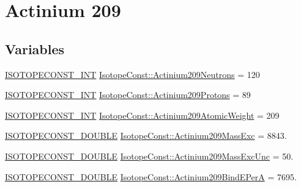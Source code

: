 \hypertarget{group___isotope_const-_actinium-_ac209}{}\section{Actinium 209}
\label{group___isotope_const-_actinium-_ac209}
\subsection*{Variables}
\begin{DoxyCompactItemize}
\item 
\mbox{\hyperlink{group___isotope_const-_macros_ga5f18360b3e99483a35c32d789e62621c}{I\+S\+O\+T\+O\+P\+E\+C\+O\+N\+S\+T\+\_\+\+I\+NT}} \mbox{\hyperlink{group___isotope_const-_actinium-_ac209_gaa674ca398914c47484caeee5ff81a41c}{Isotope\+Const\+::\+Actinium209\+Neutrons}} = 120
\item 
\mbox{\hyperlink{group___isotope_const-_macros_ga5f18360b3e99483a35c32d789e62621c}{I\+S\+O\+T\+O\+P\+E\+C\+O\+N\+S\+T\+\_\+\+I\+NT}} \mbox{\hyperlink{group___isotope_const-_actinium-_ac209_ga658730d0fc7c67960dddf769d1a6eb6e}{Isotope\+Const\+::\+Actinium209\+Protons}} = 89
\item 
\mbox{\hyperlink{group___isotope_const-_macros_ga5f18360b3e99483a35c32d789e62621c}{I\+S\+O\+T\+O\+P\+E\+C\+O\+N\+S\+T\+\_\+\+I\+NT}} \mbox{\hyperlink{group___isotope_const-_actinium-_ac209_ga344bf54eb6c8e582bc6d52e0c2c18f81}{Isotope\+Const\+::\+Actinium209\+Atomic\+Weight}} = 209
\item 
\mbox{\hyperlink{group___isotope_const-_macros_ga8f45a7272ce02c0b4c65c44636ed719a}{I\+S\+O\+T\+O\+P\+E\+C\+O\+N\+S\+T\+\_\+\+D\+O\+U\+B\+LE}} \mbox{\hyperlink{group___isotope_const-_actinium-_ac209_ga9e7c50af5b80062c038f52805f46bdc5}{Isotope\+Const\+::\+Actinium209\+Mass\+Exc}} = 8843.
\item 
\mbox{\hyperlink{group___isotope_const-_macros_ga8f45a7272ce02c0b4c65c44636ed719a}{I\+S\+O\+T\+O\+P\+E\+C\+O\+N\+S\+T\+\_\+\+D\+O\+U\+B\+LE}} \mbox{\hyperlink{group___isotope_const-_actinium-_ac209_ga2c646cde494adca0f138877fb400e49b}{Isotope\+Const\+::\+Actinium209\+Mass\+Exc\+Unc}} = 50.
\item 
\mbox{\hyperlink{group___isotope_const-_macros_ga8f45a7272ce02c0b4c65c44636ed719a}{I\+S\+O\+T\+O\+P\+E\+C\+O\+N\+S\+T\+\_\+\+D\+O\+U\+B\+LE}} \mbox{\hyperlink{group___isotope_const-_actinium-_ac209_ga1296ef385f2809251db0ca9b488c29e8}{Isotope\+Const\+::\+Actinium209\+Bind\+E\+PerA}} = 7695.
\item 

\end{DoxyCompactItemize}
